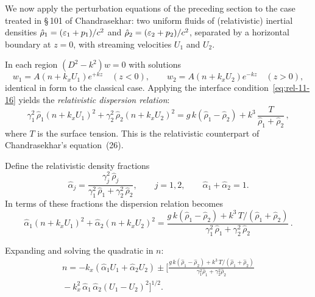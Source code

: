 We now apply the perturbation equations of the preceding section to
the case treated in \S\,101 of Chandrasekhar: two uniform fluids of
(relativistic) inertial densities $\hat{\rho}_1 = (\varepsilon_1 + p_1)/c^{2}$
and $\hat{\rho}_2 = (\varepsilon_2 + p_2)/c^{2}$, separated by a
horizontal boundary at $z = 0$, with streaming velocities $U_1$ and $U_2$.

In each region $(D^{2} - k^{2})w = 0$ with solutions
\begin{equation}\label{eq:rel-11-17}
  w_1 = A\!\left(n + k_x U_1\right) e^{+kz} \quad (z < 0),
  \qquad
  w_2 = A\!\left(n + k_x U_2\right) e^{-kz} \quad (z > 0),
\end{equation}
identical in form to the classical case.  Applying the interface
condition~\eqref{eq:rel-11-16} yields the \emph{relativistic dispersion
relation}:
\begin{equation}\label{eq:rel-11-18}
  \boxed{\;
  \gamma_1^{2}\,\hat{\rho}_1\!\left(n + k_x U_1\right)^{2}
  + \gamma_2^{2}\,\hat{\rho}_2\!\left(n + k_x U_2\right)^{2}
  = g\,k\!\left(\hat{\rho}_1 - \hat{\rho}_2\right)
  + k^{3}\,\frac{T}{\hat{\rho}_1 + \hat{\rho}_2}\,,
  \;}
\end{equation}
where $T$ is the surface tension.  This is the relativistic
counterpart of Chandrasekhar's equation~(26).

Define the relativistic density fractions
\begin{equation}\label{eq:rel-11-19}
  \hat{\alpha}_j
  = \frac{\gamma_j^{2}\,\hat{\rho}_j}
  {\gamma_1^{2}\,\hat{\rho}_1 + \gamma_2^{2}\,\hat{\rho}_2},
  \qquad j = 1,2,
  \qquad \hat{\alpha}_1 + \hat{\alpha}_2 = 1.
\end{equation}
In terms of these fractions the dispersion relation becomes
\begin{equation}\label{eq:rel-11-20}
  \hat{\alpha}_1\!\left(n + k_x U_1\right)^{2}
  + \hat{\alpha}_2\!\left(n + k_x U_2\right)^{2}
  = \frac{g\,k\!\left(\hat{\rho}_1 - \hat{\rho}_2\right)
  + k^{3}\,T/(\hat{\rho}_1+\hat{\rho}_2)}
  {\gamma_1^{2}\,\hat{\rho}_1 + \gamma_2^{2}\,\hat{\rho}_2}\,.
\end{equation}

Expanding and solving the quadratic in $n$:
\begin{multline}\label{eq:rel-11-21}
  n = -k_x\!\left(\hat{\alpha}_1 U_1 + \hat{\alpha}_2 U_2\right)
  \pm \bigg[
  \frac{g\,k(\hat{\rho}_1 - \hat{\rho}_2)
  + k^{3}\,T/(\hat{\rho}_1+\hat{\rho}_2)}
  {\gamma_1^{2}\hat{\rho}_1 + \gamma_2^{2}\hat{\rho}_2}
  \\
  {}- k_x^{2}\,\hat{\alpha}_1\,\hat{\alpha}_2\!\left(U_1 - U_2\right)^{2}
  \bigg]^{1/2}.
\end{multline}

